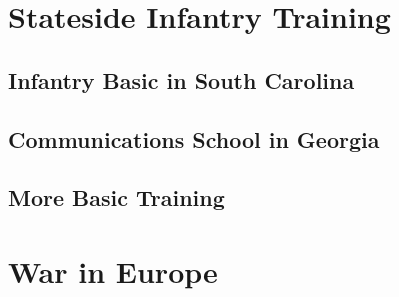 



\frontmatter
% 


\renewcommand{\cftpartaftersnumb}{\hspace{.5em}}
\renewcommand{\cftchaptername}{\hspace{1em}}
\renewcommand\cftchapteraftersnumb{\normalfont}
\renewcommand\cftbeforechapterskip{5pt plus 1pt}
\tableofcontents

\mainmatter

\part{Stateside Infantry Training}\label{stateside-infantry-training}


\chapter{Infantry Basic in South Carolina}\label{infantry-basic}


\chapter{Communications School in Georgia}\label{communications-school}


\chapter{More Basic Training}\label{more-basic-training}


\part{War in Europe}\label{war-in-europe}
